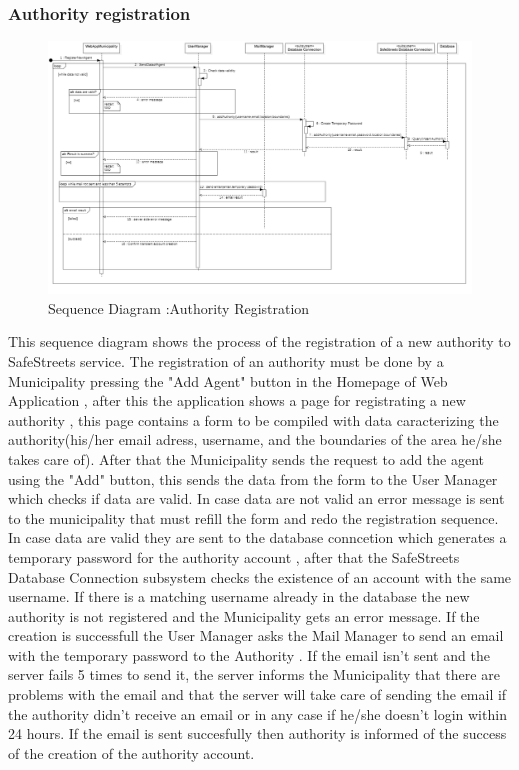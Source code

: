 \subsubsection{Authority registration}
\begin{figure}[H]
\centering
\includegraphics[width=\textwidth]{Images/SequenceAuthorityRegistration.png}
\caption{\label{fig:ComWI}Sequence Diagram :Authority Registration}
\end{figure}
This sequence diagram shows the process of the registration of a new authority to SafeStreets service.
The registration of an authority must be done by a Municipality pressing the "Add Agent" button in the Homepage of Web Application , after this the application shows a page for registrating a new authority , this page contains a form to be compiled with data caracterizing the authority(his/her email adress, username, and the boundaries of the area he/she takes care of). After that the Municipality sends the request to add the agent using the "Add" button, this sends the data from the form to the User Manager which checks if data are valid. In case data are not valid an error message is sent  to the municipality that must refill the form and redo the registration sequence. In case data are valid they are sent to the database conncetion which generates a temporary password for the authority account , after that the SafeStreets Database Connection subsystem checks the existence of an account with the same username. If there is a matching username already in the database the new authority is not registered and the Municipality gets an error message. If the creation is successfull the User Manager asks the Mail Manager to send an email with the temporary password to the Authority . If the email isn't sent and the server fails 5 times to send it, the server informs the Municipality that there are problems with the email and that the server will take care of sending the email if the authority didn't receive an email or in any case if he/she doesn't login within 24 hours. If the email is sent succesfully then authority is informed of the success of the creation of the authority account.
